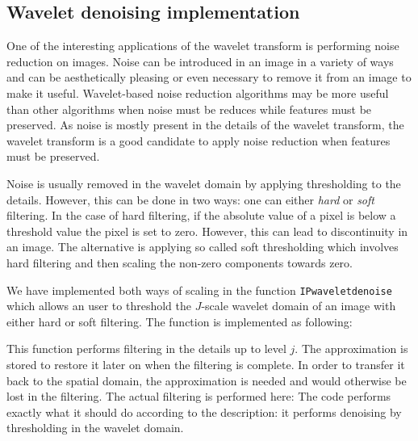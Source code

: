 \subsection{Wavelet denoising implementation}
One of the interesting applications of the wavelet transform is performing noise reduction on images. Noise can be introduced in an image in a variety of ways and can be aesthetically pleasing or even necessary to remove it from an image to make it useful. Wavelet-based noise reduction algorithms may be more useful than other algorithms when noise must be reduces while features must be preserved. As noise is mostly present in the details of the wavelet transform, the wavelet transform is a good candidate to apply noise reduction when features must be preserved.

Noise is usually removed in the wavelet domain by applying thresholding to the details. However, this can be done in two ways: one can either \textit{hard} or \textit{soft} filtering. In the case of hard filtering, if the absolute value of a pixel is below a threshold value the pixel is set to zero. However, this can lead to discontinuity in an image. The alternative is applying so called soft thresholding which involves hard filtering and then scaling the non-zero components towards zero. 

We have implemented both ways of scaling in the function \texttt{IPwaveletdenoise} which allows an user to threshold the $J$-scale wavelet domain of an image with either hard or soft filtering. The function is implemented as following:

This function performs filtering in the details up to level $j$. The approximation is stored to restore it later on when the filtering is complete. In order to transfer it back to the spatial domain, the approximation is needed and would otherwise be lost in the filtering. 
The actual filtering is performed here:
The code performs exactly what it should do according to the description: it performs denoising by thresholding in the wavelet domain. 
